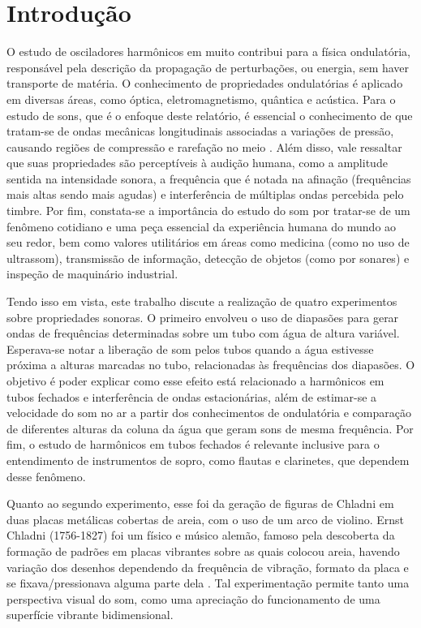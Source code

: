 \section{Introdução}
O estudo de osciladores harmônicos em muito contribui para a física ondulatória, responsável pela descrição da propagação de perturbações, ou energia, sem haver transporte de matéria. O conhecimento de propriedades ondulatórias é aplicado em diversas áreas, como óptica, eletromagnetismo, quântica e acústica. Para o estudo de sons, que é o enfoque deste relatório, é essencial o conhecimento de que tratam-se de ondas mecânicas longitudinais associadas a variações de pressão, causando regiões de compressão e rarefação no meio \cite{Nussenzveig_2014}. Além disso, vale ressaltar que suas propriedades são perceptíveis à audição humana, como a amplitude sentida na intensidade sonora, a frequência que é notada na afinação (frequências mais altas sendo mais agudas) e interferência de múltiplas ondas percebida pelo timbre. Por fim, constata-se a importância do estudo do som por tratar-se de um fenômeno cotidiano e uma peça essencial da experiência humana do mundo ao seu redor, bem como valores utilitários em áreas como medicina (como no uso de ultrassom), transmissão de informação, detecção de objetos (como por sonares) e inspeção de maquinário industrial.

Tendo isso em vista, este trabalho discute a realização de quatro experimentos sobre propriedades sonoras. O primeiro envolveu o uso de diapasões para gerar ondas de frequências determinadas sobre um tubo com água de altura variável. Esperava-se notar a liberação de som pelos tubos quando a água estivesse próxima a alturas marcadas no tubo, relacionadas às frequências dos diapasões. O objetivo é poder explicar como esse efeito está relacionado a harmônicos em tubos fechados e interferência de ondas estacionárias, além de estimar-se a velocidade do som no ar a partir dos conhecimentos de ondulatória e comparação de diferentes alturas da coluna da água que geram sons de mesma frequência. Por fim, o estudo de harmônicos em tubos fechados é relevante inclusive para o entendimento de instrumentos de sopro, como flautas e clarinetes, que dependem desse fenômeno.

Quanto ao segundo experimento, esse foi da geração de figuras de Chladni em duas placas metálicas cobertas de areia, com o uso de um arco de violino. Ernst Chladni (1756-1827) foi um físico e músico alemão, famoso pela descoberta da formação de padrões em placas vibrantes sobre as quais colocou areia, havendo variação dos desenhos dependendo da frequência de vibração, formato da placa e se fixava/pressionava alguma parte dela \cite{santos2017descobertas}. Tal experimentação permite tanto uma perspectiva visual do som, como uma apreciação do funcionamento de uma superfície vibrante bidimensional.

